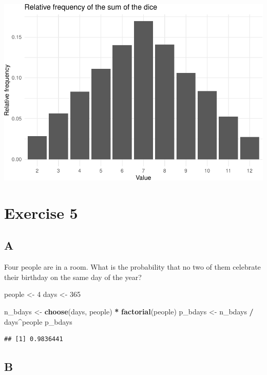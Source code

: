 \documentclass[
]{article}
\newenvironment{Shaded}{\begin{snugshade}}{\end{snugshade}}
\newcommand{\DecValTok}[1]{\textcolor[rgb]{0.00,0.00,0.81}{#1}}
\newcommand{\KeywordTok}[1]{\textcolor[rgb]{0.13,0.29,0.53}{\textbf{#1}}}
\newcommand{\NormalTok}[1]{#1}
\newcommand{\OperatorTok}[1]{\textcolor[rgb]{0.81,0.36,0.00}{\textbf{#1}}}
\newcommand{\StringTok}[1]{\textcolor[rgb]{0.31,0.60,0.02}{#1}}
\begin{document}
\includegraphics{es_files/figure-latex/unnamed-chunk-12-1.pdf}

\hypertarget{exercise-5}{%
\section{Exercise 5}\label{exercise-5}}

\hypertarget{a-4}{%
\subsection{A}\label{a-4}}

Four people are in a room. What is the probability that no two of them
celebrate their birthday on the same day of the year?

\begin{Shaded}
\begin{Highlighting}[]
\NormalTok{people \textless{}{-}}\StringTok{ }\DecValTok{4}
\NormalTok{days \textless{}{-}}\StringTok{ }\DecValTok{365}

\NormalTok{n\_bdays \textless{}{-}}\StringTok{ }\KeywordTok{choose}\NormalTok{(days, people) }\OperatorTok{*}\StringTok{ }\KeywordTok{factorial}\NormalTok{(people)}
\NormalTok{p\_bdays \textless{}{-}}\StringTok{ }\NormalTok{n\_bdays }\OperatorTok{/}\StringTok{ }\NormalTok{days}\OperatorTok{\^{}}\NormalTok{people}
\NormalTok{p\_bdays}
\end{Highlighting}
\end{Shaded}

\begin{verbatim}
## [1] 0.9836441
\end{verbatim}

\hypertarget{b-4}{%
\subsection{B}\label{b-4}}
\end{document}
